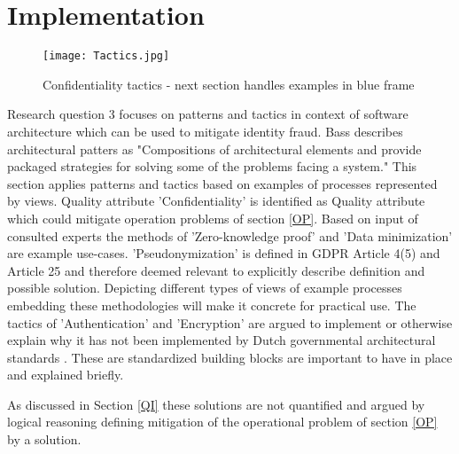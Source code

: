 \chapter{Implementation}\label{s:Implementation}

\graphicspath{ {./images/} }
    \begin{figure}
        \centering
        \texttt{[image: Tactics.jpg]}\\
        \caption{Confidentiality tactics - next section handles examples in blue frame}
        \label{fig:Tactics}
    \end{figure}

Research question 3 focuses on patterns and tactics in context of software architecture which can be used to mitigate identity fraud. Bass \etal \cite{Bass2015SoftwareAI} describes architectural patters as "Compositions of architectural elements and provide packaged strategies for solving some of the problems facing a system." This section applies patterns and tactics based on examples of processes represented by views. Quality attribute 'Confidentiality' is identified as Quality attribute which could mitigate operation problems of section \ref{OP}. Based on input of consulted experts the methods of 'Zero-knowledge proof' and 'Data minimization' are example use-cases. 'Pseudonymization' is defined in GDPR Article 4(5) and Article 25 \cite{GDPR} and therefore deemed relevant to explicitly describe definition and possible solution. Depicting different types of views of example processes embedding these methodologies will make it concrete for practical use. The tactics of 'Authentication' and 'Encryption' are argued to implement or otherwise explain why it has not been implemented by Dutch governmental architectural standards \cite{NORA_PasToeOfLegUit}. These are standardized building blocks are important to have in place and explained briefly. 

As discussed in Section \ref{QI} these solutions are not quantified and argued by logical reasoning defining mitigation of the operational problem of section \ref{OP} by a solution.


